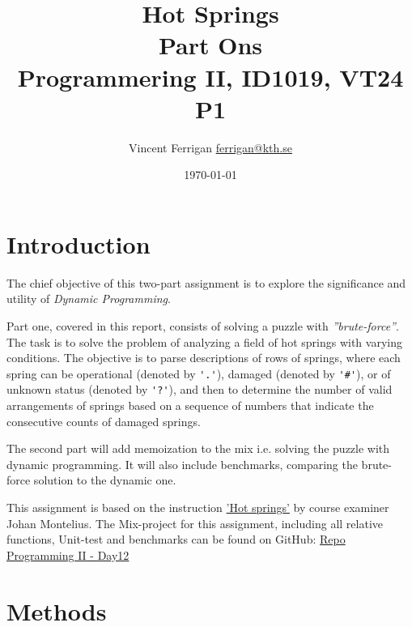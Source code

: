 \documentclass[a4paper,11pt]{article}
\begin{document}
\title{
    Hot Springs
    \\Part Ons
\\\small{Programmering II, ID1019, VT24 P1}
}
\author{Vincent Ferrigan \href{mailto:ferrigan@kth.se}{ferrigan@kth.se}}

\date{\today}

\maketitle

\section*{Introduction}
\label{sec:introduction}
The chief objective of this two-part assignment is to explore the significance
and utility of \emph{Dynamic Programming}.

Part one, covered in this report, consists of solving a puzzle with
\emph{''brute-force''}.
The task is to solve the problem of analyzing a field of
hot springs with varying conditions.
The objective is to parse descriptions of rows of springs,
where each spring can be operational (denoted by \verb|'.'|),
damaged (denoted by \verb|'#'|), or of unknown status (denoted by \verb|'?'|),
and then to determine the number of valid arrangements of springs
based on a sequence of numbers that indicate the consecutive counts of damaged springs.

The second part will add memoization to the mix i.e.
solving the puzzle with dynamic programming.
It will also include benchmarks, comparing the brute-force solution to the dynamic one.


This assignment is based on the instruction
\href{https://people.kth.se/~johanmon/courses/id1019/seminars/springs/springs.pdf}{'Hot springs'}
by course examiner Johan Montelius.
The Mix-project for this assignment, including all relative functions, Unit-test and benchmarks can be found on GitHub:
\href{https://github.com/VincentFerrigan/kth-id1019-programming-ii/tree/main/tasks/5/day12}{Repo Programming II - Day12}%

\section*{Methods}\label{sec:methods}
\end{document}

